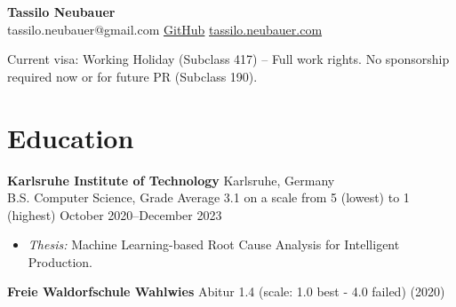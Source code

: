 \documentclass[letterpaper, 9pt]{article}
\newcommand{\header}[4]{
    \begin{center}
        \textbf{\Huge{#1}}\\
        \small{
            \textcolor{accent}{#2} \hspace{1em}
            \href{#3}{GitHub}\hspace{1em}
            \href{#4}{tassilo.neubauer.com}
        }
    \end{center}
}
\begin{document}
\header{Tassilo Neubauer}{tassilo.neubauer@gmail.com}{https://github.com/sonofhypnos}{https://www.tassiloneubauer.com/}

\ifdefined\AustraliaVersion
    \begin{center}
\small{Current visa: Working Holiday (Subclass 417) – Full work rights. No sponsorship required now or for future PR (Subclass 190).}
    \end{center}
\fi


\section*{Education}
\textbf{Karlsruhe Institute of Technology} \hfill Karlsruhe, Germany \\
B.S. Computer Science, Grade Average 3.1 on a scale from 5 (lowest) to 1 (highest) \hfill October 2020--December 2023
\begin{itemize}
    \item \textit{Thesis:} Machine Learning-based Root Cause Analysis for Intelligent Production.
\end{itemize}
\textbf{Freie Waldorfschule Wahlwies} \hfill Abitur 1.4 (scale: 1.0 best - 4.0 failed) (2020)
\end{document}
